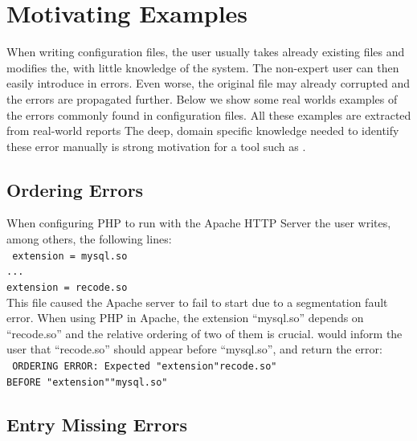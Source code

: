 \section{Motivating Examples}
\label{sec:motiv}

When writing configuration files, the user usually takes already existing files and modifies the, with little knowledge of the system. 
The non-expert user can then easily introduce in errors.
Even worse, the original file may already corrupted and the errors are propagated further. 
Below we show some real worlds examples of the errors commonly found in configuration files.
All these examples are extracted from real-world reports %
The deep, domain specific knowledge needed to identify these error manually is strong motivation for a tool such as \app.

\subsection{Ordering Errors}

When configuring PHP to run with the Apache HTTP Server the user writes, among others, the following lines:\\
 \texttt{
 \hspace*{3em}extension = mysql.so\\
 \hspace*{3em}...\\
 \hspace*{3em}extension = recode.so}\\
This file caused the Apache server to fail to start due to a segmentation fault error.
When using PHP in Apache, the extension ``mysql.so'' depends on ``recode.so'' and the relative ordering of two of them is crucial. 
\app would inform the user that ``recode.so'' should appear before ``mysql.so'', and return the error:\\
 \texttt{
ORDERING ERROR: Expected "extension"recode.so"\\
   BEFORE "extension""mysql.so"
  }

\subsection{Entry Missing Errors}

